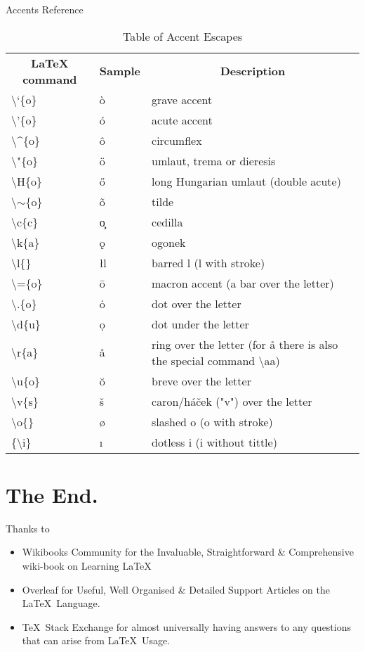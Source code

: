 \documentclass{beamer}
\begin{document}
\begin{frame}{Accents Reference}
\tiny{
\begin{table}[]
\begin{tabular}{lll}
\multicolumn{1}{c}{\textbf{LaTeX command}} & \multicolumn{1}{c}{\textbf{Sample}} & \multicolumn{1}{c}{\textbf{Description}} \\
\textbackslash{}`\{o\} & \`{o} & grave accent \\
\textbackslash{}'\{o\} & \'{o} & acute accent \\
\textbackslash{}\textasciicircum{}\{o\} & \^{o} & circumflex \\
\textbackslash{}"\{o\} & \"{o} & umlaut, trema or dieresis \\
\textbackslash{}H\{o\} & \H{o} & long Hungarian umlaut (double acute) \\
\textbackslash{}$\sim$\{o\} & \~{o} & tilde \\
\textbackslash{}c\{c\} &\c{o} & cedilla \\
\textbackslash{}k\{a\} & \k{o} & ogonek \\
\textbackslash{}l\{\} & \l{l} & barred l (l with stroke) \\
\textbackslash{}=\{o\} & \={o} & macron accent (a bar over the letter) \\
\textbackslash{}.\{o\} & \.{o} & dot over the letter \\
\textbackslash{}d\{u\} & \d{o}& dot under the letter \\
\textbackslash{}r\{a\} & \r{a} & ring over the letter (for å there is also the special command \textbackslash{}aa) \\
\textbackslash{}u\{o\} & \u{o} & breve over the letter \\
\textbackslash{}v\{s\} & \v{s} & caron/háček ("v") over the letter \\
\textbackslash{}o\{\} & \o{} & slashed o (o with stroke) \\
\{\textbackslash{}i\} & \i{} & dotless i (i without tittle)
\end{tabular}
\caption{Table of Accent Escapes}
\label{tabAccentChars}
\end{table}}%
\end{frame}

\section{The End.}

\begin{frame}{Thanks to }
\begin{itemize}

\item Wikibooks Community for the Invaluable, Straightforward \& Comprehensive wiki-book on Learning \LaTeX
\item Overleaf for Useful, Well Organised \& Detailed Support Articles on the \LaTeX~Language.
\item \TeX~Stack Exchange for almost universally having answers to any questions that can arise from \LaTeX~Usage.

\end{itemize}

\end{frame}
\end{document}
